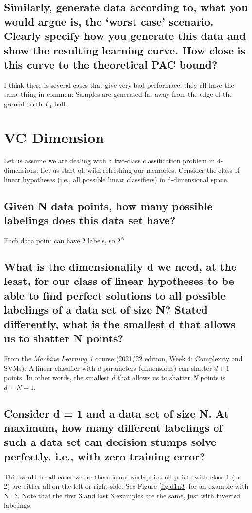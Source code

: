 \documentclass[11pt,a4paper]{article}
\begin{document}
\subsection{Similarly, generate data according to, what you would argue is, the ‘worst case’ scenario. Clearly specify how you generate this data and show the resulting learning curve. How close is this curve to the theoretical PAC bound?}

I think there is several cases that give very bad performace, they all have the same thing in common: Samples are generated far away from the edge of the ground-truth $L_1$ ball.

\clearpage
\section{VC Dimension}
\label{sec:VC}
Let us assume we are dealing with a two-class classification problem in d-dimensions.
Let us start off with refreshing our memories. Consider the class of linear hypotheses (i.e.,
all possible linear classifiers) in d-dimensional space.

\subsection{Given N data points, how many possible labelings does this data set have?}
\label{sec:2a}
Each data point can have 2 labels, so $2^N$

\subsection{What is the dimensionality d we need, at the least, for our class of linear hypotheses to
be able to find perfect solutions to all possible labelings of a data set of size N? Stated
differently, what is the smallest d that allows us to shatter N points?}
\label{sec:2b}

From the \textit{Machine Learning 1} course (2021/22 edition, Week 4: Complexity and SVMs): A linear classifier with $d$ parameters (dimensions) can shatter $d+1$ points. In other words, the smallest $d$ that allows us to shatter $N$ points is $d = N - 1$. 

\subsection{Consider d = 1 and a data set of size N. At maximum, how many different labelings of
such a data set can decision stumps solve perfectly, i.e., with zero training error?}
\label{sec:2c}
This would be all cases where there is no overlap, i.e. all points with class 1 (or 2) are either all on the left or right side. See Figure \ref{fig:d1n3} for an example with N=3. Note that the first 3 and last 3 examples are the same, just with inverted labelings.
\end{document}
